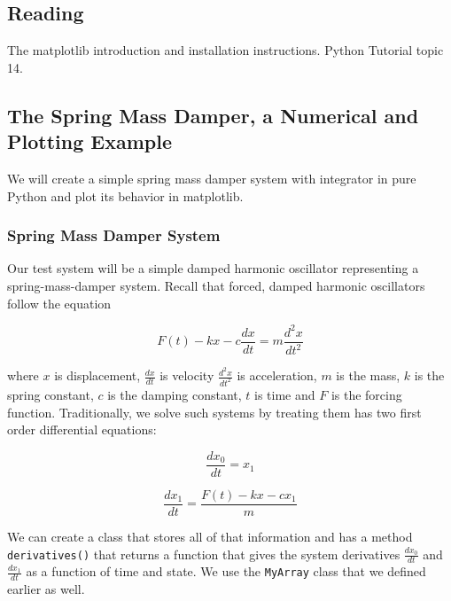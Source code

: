 \documentclass{report}
\begin{document}
\subsection{Reading}
The matplotlib introduction and installation instructions. Python Tutorial topic 14.

\subsection{The Spring Mass Damper, a Numerical and Plotting Example}

We will create a simple spring mass damper system with integrator in pure Python and plot its behavior in matplotlib.

\subsubsection{Spring Mass Damper System}

Our test system will be a simple damped harmonic oscillator representing a spring-mass-damper system. Recall that forced, damped harmonic oscillators follow the equation\cite{website:wikipedia}

\begin{displaymath}
F(t)-kx-c\frac{dx}{dt}=m\frac{d^2x}{dt^2}
\end{displaymath}

where \(x\) is displacement, \(\frac{dx}{dt}\) is velocity \(\frac{d^2x}{dt^2}\) is acceleration, \(m\) is the mass, \(k\) is the spring constant, \(c\) is the damping constant, \(t\) is time and \(F\) is the forcing function. Traditionally, we solve such systems by treating them has two first order differential equations:

\begin{displaymath}
\frac{dx_0}{dt} = x_1
\end{displaymath}

\begin{displaymath}
\frac{dx_1}{dt} =  \frac{F(t)-kx-c x_1}{m}
\end{displaymath}


We can create a class that stores all of that information and has a method \verb|derivatives()| that returns a function that gives the system derivatives \(\frac{dx_0}{dt}\) and \(\frac{dx_1}{dt}\) as a function of time and state. We use the \verb|MyArray| class that we defined earlier as well. 
\end{document}
